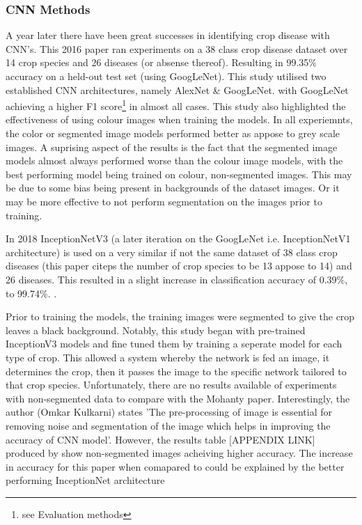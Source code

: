   \subsubsection{CNN Methods}
    A year later \citep{Mohanty2016} there have been great successes in identifying crop disease with CNN's. This 2016 paper ran experiments on a 38 class crop disease dataset over 14 crop species and 26 diseases (or absense thereof). Resulting in 99.35\% accuracy on a held-out test set (using GoogLeNet). This study utilised two established CNN architectures, namely AlexNet \citep{Krizhevsky} \& GoogLeNet. \citep{Szegedy_2015_CVPR} with GoogLeNet achieving a higher F1 score\footnote{see Evaluation methods} in almost all cases.
    This study also highlighted the effectiveness of using colour images when training the models. In all experiemnts, the color or segmented image models performed better as appose to grey scale images. A suprising aspect of the results is the fact that the segmented image models almost always performed worse than the colour image models, with the best performing model being trained on colour, non-segmented images. This may be due to some bias being present in backgrounds of the dataset images. Or it may be more effective to not perform segmentation on the images prior to training.
    \par
    In 2018 InceptionNetV3 (a later iteration on the GoogLeNet i.e. InceptionNetV1 architecture) is used on a very similar if not the same dataset of 38 class crop diseases (this paper citeps the number of crop species to be 13 appose to 14) and 26 diseases. This resulted in a slight increase in classification accuracy of 0.39\%, to 99.74\%. \citep{Kulkarni2018}.
    \par
    Prior to training the models, the training images were segmented to give the crop leaves a black background.
    Notably, this study began with pre-trained InceptionV3 models and fine tuned them by training a seperate model for each type of crop. This allowed a system whereby the network is fed an image, it determines the crop, then it passes the image to the specific network tailored to that crop species.
    Unfortunately, there are no results available of experiments with non-segmented data to compare with the Mohanty paper. Interestingly, the author (Omkar Kulkarni) states 'The pre-processing of image is essential for removing noise and segmentation of the image which helps in improving the accuracy of CNN model'. However, the results table [APPENDIX LINK] produced by \citep{Mohanty2016} show non-segmented images acheiving higher accuracy. The increase in accuracy for this paper when comapared to \citep{Mohanty2016} could be explained by the better performing InceptionNet architecture %

